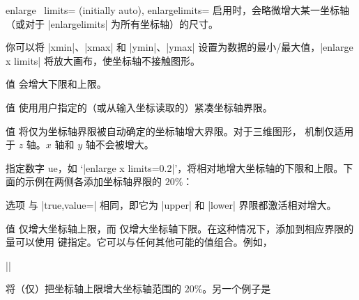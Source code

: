 \begin{pgfplotsxykeylist}{%
    enlarge \x\ limits= (initially auto),
    enlargelimits=%
}
    启用时，会略微增大某一坐标轴（或对于 |enlargelimits| 为所有坐标轴）的尺寸。

    你可以将 |xmin|、|xmax| 和 |ymin|、|ymax| 设置为数据的最小/最大值，|enlarge x limits| 将放大画布，使坐标轴不接触图形。

    值  会增大下限和上限。

    值  使用用户指定的（或从输入坐标读取的）紧凑坐标轴界限。

    值  将仅为坐标轴界限被自动确定的坐标轴增大界限。对于三维图形， 机制仅适用于 $z$ 轴。$x$ 轴和 $y$ 轴不会被增大。
\begin{codeexample}[]
\end{codeexample}

     指定数字 ue，如 `|enlarge x limits=0.2|'，将相对地增大坐标轴的下限和上限。下面的示例在两侧各添加坐标轴界限的 $20\%$：
\begin{codeexample}[]
\end{codeexample}
    \noindent 选项  与 |true,value=| 相同，即它为 |upper| 和 |lower| 界限都激活相对增大。

    值  仅增大坐标轴上限，而  仅增大坐标轴下限。在这种情况下，添加到相应界限的量可以使用  键指定。它可以与任何其他可能的值组合。例如，

        ||

    将（仅）把坐标轴上限增大坐标轴范围的 $20\%$。另一个例子是


\end{pgfplotsxykeylist}
